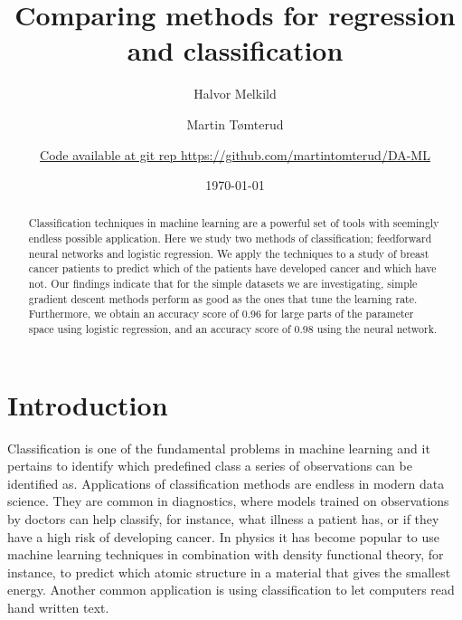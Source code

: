 \documentclass[a4paper,
amsfonts,
amssymb,
amsmath,
reprint,
showkeys,
nofootinbib,
twoside]{revtex4-2}
\begin{document}
\title{Comparing methods for regression and classification}

\author{Halvor Melkild}

\author{Martin Tømterud}

\author{\textcolor{blue}{\href{https://github.com/martintomterud/DA-ML}{Code available at git rep https://github.com/martintomterud/DA-ML}}}

\date{\today}

\begin{abstract}
Classification techniques in machine learning are a powerful set of tools with seemingly endless possible application. Here we study two methods of classification; feedforward neural networks and logistic regression. We apply the techniques to a study of breast cancer patients to predict which of the patients have developed cancer and which have not. Our findings indicate that for the simple datasets we are investigating, simple gradient descent methods perform as good as the ones that tune the learning rate. Furthermore, we obtain an accuracy score of 0.96 for large parts of the parameter space using logistic regression, and an accuracy score of 0.98 using the neural network.
\end{abstract}


\maketitle

\section{Introduction}

Classification is one of the fundamental problems in machine learning and it pertains to identify which predefined class a series of observations can be identified as. Applications of classification methods are endless in modern data science. They are common in diagnostics, where models trained on observations by doctors can help classify, for instance, what illness a patient has, or if they have a high risk of developing cancer. In physics it has become popular to use machine learning techniques in combination with density functional theory, for instance, to predict which atomic structure in a material that gives the smallest energy. Another common application is using classification to let computers read hand written text.
\end{document}
